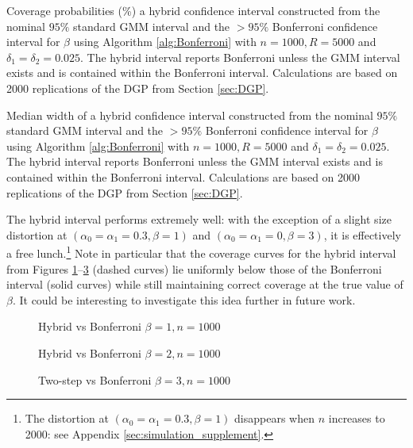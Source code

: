 \begin{table}
  \centering
  
  \caption{Coverage probabilities (\%) a hybrid confidence interval constructed from the nominal $95\%$ standard GMM interval and the $>95\%$ Bonferroni confidence interval for $\beta$ using Algorithm \ref{alg:Bonferroni} with $n = 1000, R = 5000$ and $\delta_1 = \delta_2 = 0.025$. The hybrid interval reports Bonferroni unless the GMM interval exists and is contained within the Bonferroni interval. Calculations are based on 2000 replications of the DGP from Section \ref{sec:DGP}.}
  \label{tab:twostep_cover_1000}
\end{table}

\begin{table}
  \centering
  
  \caption{Median width of a hybrid confidence interval constructed from the nominal $95\%$ standard GMM interval and the $>95\%$ Bonferroni confidence interval for $\beta$ using Algorithm \ref{alg:Bonferroni} with $n = 1000, R = 5000$ and $\delta_1 = \delta_2 = 0.025$. The hybrid interval reports Bonferroni unless the GMM interval exists and is contained within the Bonferroni interval. Calculations are based on 2000 replications of the DGP from Section \ref{sec:DGP}.}
  \label{tab:twostep_width_1000}
\end{table}

The hybrid interval performs extremely well: with the exception of a slight size distortion at $(\alpha_0 = \alpha_1 = 0.3, \beta = 1)$ and $(\alpha_0 = \alpha_1 = 0, \beta = 3)$, it is effectively a free lunch.\footnote{The distortion at $(\alpha_0 = \alpha_1 = 0.3, \beta = 1)$ disappears when $n$ increases to 2000: see Appendix \ref{sec:simulation_supplement}.}
Note in particular that the coverage curves for the hybrid interval from Figures \ref{fig:2step_1_1000}--\ref{fig:2step_3_1000} (dashed curves) lie uniformly below those of the Bonferroni interval (solid curves) while still maintaining correct coverage at the true value of $\beta$.
It could be interesting to investigate this idea further in future work.

\begin{figure}
  \centering
  \caption{Hybrid vs Bonferroni $\beta = 1, n = 1000$}
  \label{fig:2step_1_1000}
\end{figure}

\begin{figure}
  \centering
  \caption{Hybrid vs Bonferroni $\beta = 2, n = 1000$}
  \label{fig:2step_2_1000}
\end{figure}

\begin{figure}
  \centering
  \caption{Two-step vs Bonferroni $\beta = 3, n = 1000$}
  \label{fig:2step_3_1000}
\end{figure}
